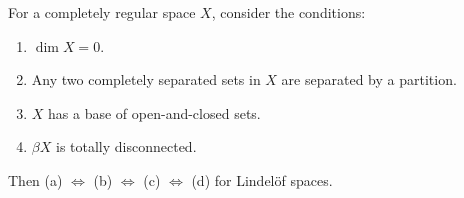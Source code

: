 For a completely regular space $X$, consider the conditions:
\begin{enumerate}
\item[(a)] $\dim X = 0$.
\item[(b)] Any two completely separated sets in $X$ are separated by a partition.
\item[(c)] $X$ has a base of open-and-closed sets.
\item[(d)] $\beta X$ is totally disconnected.
\end{enumerate}
Then (a) $\Leftrightarrow$ (b) $\Leftrightarrow$ (c) $\Leftrightarrow$ (d) for Lindelöf spaces.

